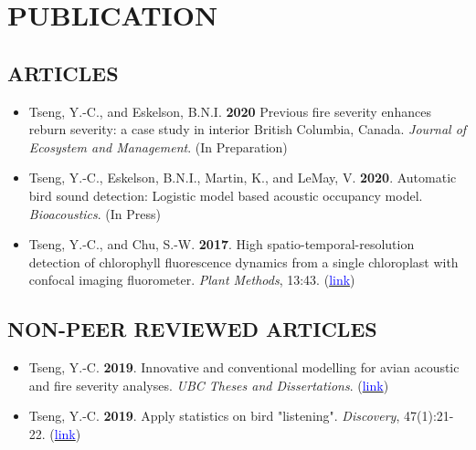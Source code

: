 \documentclass[11pt,letterpaper,sans]{moderncv}        %
\begin{document}
{%
\section{PUBLICATION}
\subsection{ARTICLES}
\begin{itemize}
\item{Tseng, Y.-C., and Eskelson, B.N.I. \textbf{2020} Previous fire severity enhances reburn severity: a case study in interior British Columbia, Canada. \textit{Journal of Ecosystem and Management}. (In Preparation)}
\vspace{3pt}


\item{Tseng, Y.-C., Eskelson, B.N.I., Martin, K., and LeMay, V. \textbf{2020}. Automatic bird sound detection: Logistic model based acoustic occupancy model. \textit{Bioacoustics}. (In Press)}
\vspace{3pt}


\item{Tseng, Y.-C., and Chu, S.-W. \textbf{2017}. High spatio-temporal-resolution detection of chlorophyll fluorescence dynamics from a single chloroplast with confocal imaging fluorometer. \textit{Plant Methods}, 13:43. (\href{https://doi.org/10.1186/s13007-017-0194-2}{\textcolor{blue}{link}})}
\end{itemize}

\subsection{NON-PEER REVIEWED ARTICLES}
\begin{itemize}
\item{Tseng, Y.-C. \textbf{2019}. Innovative and conventional modelling for avian acoustic and fire severity analyses. \textit{UBC Theses and Dissertations}}. (\href{https://open.library.ubc.ca/cIRcle/collections/ubctheses/24/items/1.0385980}{\textcolor{blue}{link}})
\vspace{3pt}




\item{Tseng, Y.-C. \textbf{2019}. Apply statistics on bird "listening". \textit{Discovery}}, 47(1):21-22. (\href{https://drive.google.com/open?id=1lZC8H246lFH-XCGI6vtBjXMIq1YqukUG}{\textcolor{blue}{link}})
\vspace{3pt}


\end{itemize}}
\end{document}
